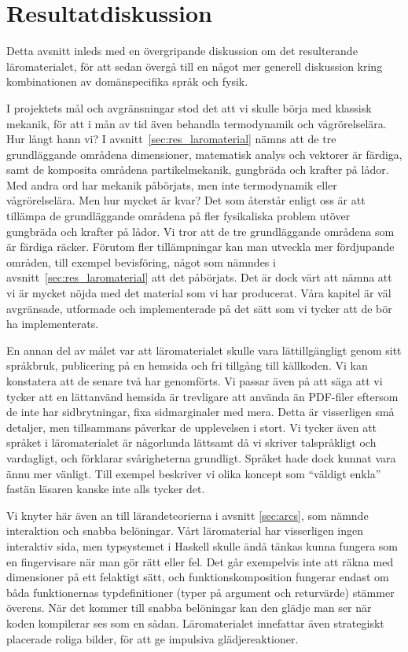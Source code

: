 \section{Resultatdiskussion}\label{sec:res_disk}

Detta avsnitt inleds med en övergripande diskussion om det resulterande
läromaterialet, för att sedan övergå till en något mer generell diskussion kring
kombinationen av domänspecifika språk och fysik.

I projektets mål och avgränsningar stod det att vi skulle börja med klassisk
mekanik, för att i mån av tid även behandla termodynamik och vågrörelselära. Hur långt
hann vi? I avsnitt~\ref{sec:res_laromaterial} nämns att de tre grundläggande
områdena dimensioner, matematisk analys och vektorer är färdiga, samt de
komposita områdena partikelmekanik, gungbräda och krafter på lådor. Med andra
ord har mekanik påbörjats, men inte termodynamik eller vågrörelselära. Men hur mycket är
kvar? Det som återstår enligt oss är att tillämpa de grundläggande områdena på
fler fysikaliska problem utöver gungbräda och krafter på lådor. Vi tror att de
tre grundläggande områdena som är färdiga räcker. Förutom fler tillämpningar kan
man utveckla mer fördjupande områden, till exempel bevisföring, något som
nämndes i avsnitt~\ref{sec:res_laromaterial} att det påbörjats. Det är dock värt
att nämna att vi är mycket nöjda med det material som vi har producerat. Våra
kapitel är väl avgränsade, utformade och implementerade på det sätt som vi
tycker att de bör ha implementerats. 

En annan del av målet var att läromaterialet skulle vara lättillgängligt genom
sitt språkbruk, publicering på en hemsida och fri tillgång till källkoden.
Vi kan konstatera att de senare två har genomförts. Vi passar även på att
säga att vi tycker att en lättanvänd hemsida är trevligare att använda än
PDF-filer eftersom de inte har sidbrytningar, fixa sidmarginaler med mera. Detta
är visserligen små detaljer, men tillsammans påverkar de upplevelsen i stort. Vi
tycker även att språket i läromaterialet är någorlunda lättsamt då vi skriver
talspråkligt och vardagligt, och förklarar svårigheterna grundligt. Språket hade
dock kunnat vara ännu mer vänligt. Till exempel beskriver vi olika koncept som
``väldigt enkla'' fastän läsaren kanske inte alls tycker det.

Vi knyter här även an till lärandeteorierna i avsnitt \ref{sec:arcs}, som nämnde interaktion och snabba belöningar. Vårt läromaterial har visserligen ingen interaktiv sida, men typsystemet i Haskell skulle ändå tänkas kunna fungera som en fingervisare när man gör rätt eller fel. Det går exempelvis inte att räkna med dimensioner på ett felaktigt sätt, och funktionskomposition fungerar endast om båda funktionernas typdefinitioner (typer på argument och returvärde) stämmer överens. När det kommer till snabba belöningar kan den glädje man ser när koden kompilerar ses som en sådan. Läromaterialet innefattar även strategiskt placerade roliga bilder, för att ge impulsiva glädjereaktioner.

